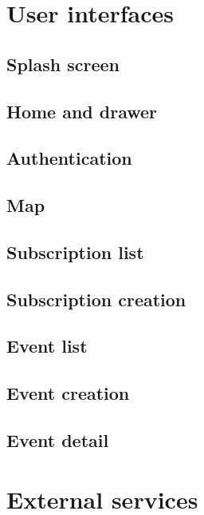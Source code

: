 \documentclass[a4paper]{scrreprt}
\begin{document}
\chapter{User interfaces}

\section{Splash screen}

\section{Home and drawer}

\section{Authentication}

\section{Map}

\section{Subscription list}

\section{Subscription creation}

\section{Event list}

\section{Event creation}

\section{Event detail}


\chapter{External services}
\end{document}
